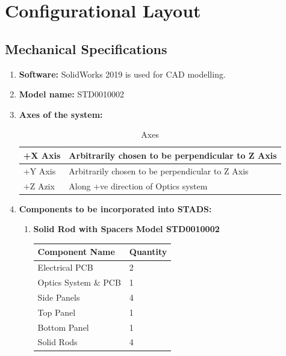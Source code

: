 \documentclass[../../main.tex]{subfiles}
\begin{document}
\section{Configurational Layout}
\subsection{Mechanical Specifications}
\begin{enumerate}
    \item \textbf{Software:} SolidWorks 2019 is used for CAD modelling.
    \item \textbf{Model name:} STD0010002
    \item \textbf{Axes of the system:}
    \begin{table}[h!]
        \centering
        \begin{tabular}{| p{2cm} | p{7cm} |}
             \hline
             +X Axis & Arbitrarily chosen to be perpendicular to Z Axis \\
             \hline
             +Y Axis & Arbitrarily chosen to be perpendicular to Z Axis\\
             \hline
             +Z Azix & Along +ve direction of Optics system\\
             \hline
        \end{tabular}
        \caption{Axes}
        \label{tab:my_label}
    \end{table}
        \item \textbf{Components to be incorporated into STADS:}
        \begin{enumerate}
            \item \textbf{Solid Rod with Spacers Model STD0010002}
            \begin{table}[h!]
        \centering
        \begin{tabular}{| p{5cm} | p{3cm} |}
             \hline
             \textbf{Component Name} & \textbf{Quantity}  \\
             \hline
             Electrical PCB & 2 \\
             \hline
             Optics System \& PCB & 1\\
             \hline
             Side Panels & 4 \\
             \hline
             Top Panel & 1 \\
             \hline
             Bottom Panel & 1 \\
             \hline
             Solid Rods & 4 \\

\end{tabular}
\end{table}
\end{enumerate}
\end{enumerate}
\end{document}
